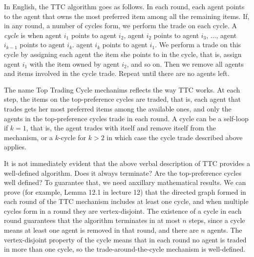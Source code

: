 \documentclass[12pt]{article}
\begin{document}
In English, the TTC algorithm goes as follows. In each round, each agent points to the agent that owns the most preferred item among all the remaining items. If, in any round, a number of cycles form, we perform the trade on each cycle. A \textit{cycle} is when agent $i_1$ points to agent $i_2$, agent $i_2$ points to agent $i_3$, ..., agent $i_{k-1}$ points to agent $i_k$. agent $i_k$ points to agent $i_1$. We perform a trade on this cycle by assigning each agent the item she points to in the cycle, that is, assign agent $i_1$ with the item owned by agent $i_2$, and so on. Then we remove all agents and items involved in the cycle trade. Repeat until there are no agents left.

The name Top Trading Cycle mechanims reflects the way TTC works. At each step, the items on the top-preference cycles are traded, that is, each agent that trades gets her most preferred items among the available ones, and only the agents in the top-preference cycles trade in each round. A cycle can be a self-loop if $k=1$, that is, the agent trades with itself and remove itself from the mechanism, or a $k$-cycle for $k>2$ in which case the cycle trade described above applies.

It is not immediately evident that the above verbal description of TTC provides a well-defined algorithm. Does it always terminate? Are the top-preference cycles well defined? To guarantee that, we need anxillary mathematical results. We can prove (for example, Lemma 12.1 in lecture 12) that the directed graph formed in each round of the TTC mechanism includes at least one cycle, and when multiple cycles form in a round they are vertex-disjoint. The existence of a cycle in each round guarantees that the algorithm terminates in at most $n$ steps, since a cycle means at least one agent is removed in that round, and there are $n$ agents. The vertex-disjoint property of the cycle means that in each round no agent is traded in more than one cycle, so the trade-around-the-cycle mechanism is well-defined. 
\end{document}
